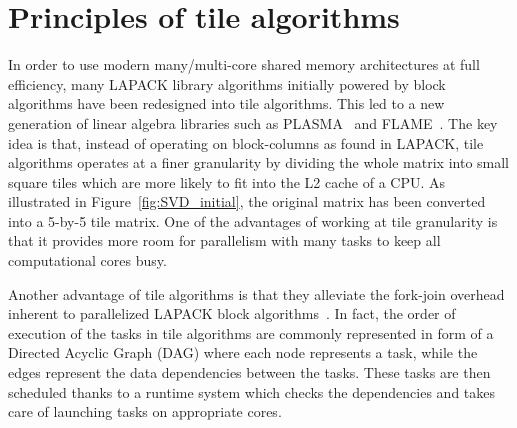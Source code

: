 \section{Principles of tile algorithms}\label{sec:tile}
In order to use modern many/multi-core shared memory architectures at
full efficiency,
many LAPACK library algorithms initially powered by
block algorithms have been redesigned into tile algorithms.
This led to a new generation of linear algebra libraries such as
PLASMA~\cite{DBLP:journals/corr/abs-0709-1272} and FLAME~\cite{FLAWN3}.
The key idea is that,
instead of operating on block-columns as found in LAPACK,
tile algorithms operates at a finer granularity by dividing the whole
matrix into small square tiles which are more likely to fit into the
L2 cache of a CPU.
As illustrated in Figure~\ref{fig:SVD_initial}, the original
matrix has been converted into a 5-by-5 tile matrix.  One of the
advantages of working at tile granularity is that it provides more
room for parallelism with many tasks to keep all computational cores
busy.

Another advantage of tile algorithms is that they alleviate
the fork-join overhead inherent to parallelized LAPACK
block algorithms~\cite{haidar2012analysis}.
In fact,
the order of execution of the tasks in tile algorithms are commonly
represented in form of a Directed Acyclic Graph (DAG) where each node
represents a task, while the edges represent the
data dependencies between the tasks.
These tasks are then scheduled
thanks to a runtime system which checks the dependencies and
takes care of launching tasks on appropriate cores.

